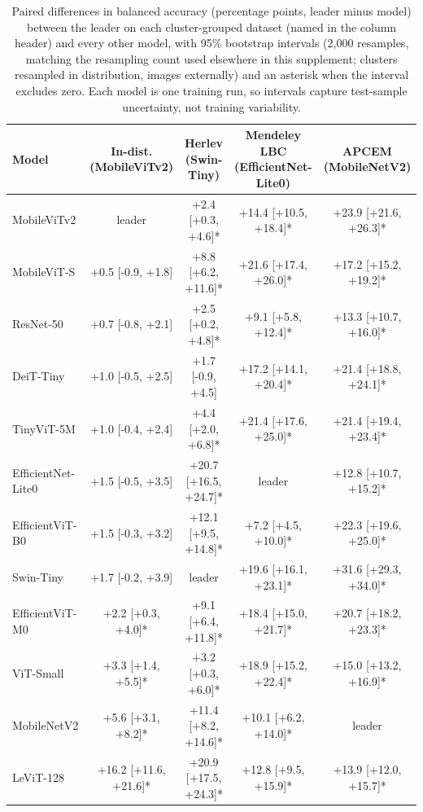 \documentclass[12pt,letterpaper]{article}
\begin{document}
\begin{table}[htbp]
\centering
\caption{Paired differences in balanced accuracy (percentage points, leader minus model) between the leader on each cluster-grouped dataset (named in the column header) and every other model, with 95\% bootstrap intervals (2,000 resamples, matching the resampling count used elsewhere in this supplement; clusters resampled in distribution, images externally) and an asterisk when the interval excludes zero. Each model is one training run, so intervals capture test-sample uncertainty, not training variability.}
\label{tab:paired}
\scriptsize
\begin{tabular}{@{}lcccc@{}}
\toprule
Model & In-dist. (MobileViTv2) & Herlev (Swin-Tiny) & Mendeley LBC (EfficientNet-Lite0) & APCEM (MobileNetV2) \\
\midrule
MobileViTv2 & leader & +2.4 [+0.3, +4.6]* & +14.4 [+10.5, +18.4]* & +23.9 [+21.6, +26.3]* \\
MobileViT-S & +0.5 [-0.9, +1.8] & +8.8 [+6.2, +11.6]* & +21.6 [+17.4, +26.0]* & +17.2 [+15.2, +19.2]* \\
ResNet-50 & +0.7 [-0.8, +2.1] & +2.5 [+0.2, +4.8]* & +9.1 [+5.8, +12.4]* & +13.3 [+10.7, +16.0]* \\
DeiT-Tiny & +1.0 [-0.5, +2.5] & +1.7 [-0.9, +4.5] & +17.2 [+14.1, +20.4]* & +21.4 [+18.8, +24.1]* \\
TinyViT-5M & +1.0 [-0.4, +2.4] & +4.4 [+2.0, +6.8]* & +21.4 [+17.6, +25.0]* & +21.4 [+19.4, +23.4]* \\
EfficientNet-Lite0 & +1.5 [-0.5, +3.5] & +20.7 [+16.5, +24.7]* & leader & +12.8 [+10.7, +15.2]* \\
EfficientViT-B0 & +1.5 [-0.3, +3.2] & +12.1 [+9.5, +14.8]* & +7.2 [+4.5, +10.0]* & +22.3 [+19.6, +25.0]* \\
Swin-Tiny & +1.7 [-0.2, +3.9] & leader & +19.6 [+16.1, +23.1]* & +31.6 [+29.3, +34.0]* \\
EfficientViT-M0 & +2.2 [+0.3, +4.0]* & +9.1 [+6.4, +11.8]* & +18.4 [+15.0, +21.7]* & +20.7 [+18.2, +23.3]* \\
ViT-Small & +3.3 [+1.4, +5.5]* & +3.2 [+0.3, +6.0]* & +18.9 [+15.2, +22.4]* & +15.0 [+13.2, +16.9]* \\
MobileNetV2 & +5.6 [+3.1, +8.2]* & +11.4 [+8.2, +14.6]* & +10.1 [+6.2, +14.0]* & leader \\
LeViT-128 & +16.2 [+11.6, +21.6]* & +20.9 [+17.5, +24.3]* & +12.8 [+9.5, +15.9]* & +13.9 [+12.0, +15.7]* \\
\bottomrule
\end{tabular}
\end{table}
\end{document}

